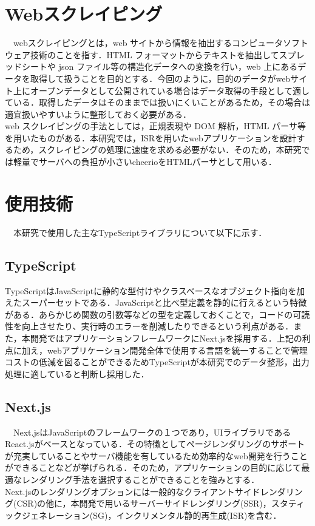 \section{Webスクレイピング}

　webスクレイピングとは，web サイトから情報を抽出するコンピュータソフトウェア技術のことを指す．HTML フォーマットからテキストを抽出してスプレッドシートや json ファイル等の構造化データへの変換を行い，web 上にあるデータを取得して扱うことを目的とする．今回のように，目的のデータがwebサイト上にオープンデータとして公開されている場合はデータ取得の手段として適している．取得したデータはそのままでは扱いにくいことがあるため，その場合は適宜扱いやすいように整形しておく必要がある．
 \\web スクレイピングの手法としては，正規表現や DOM 解析，HTML パーサ等を用いたものがある．本研究では，ISRを用いたwebアプリケーションを設計するため，スクレイピングの処理に速度を求める必要がない．そのため，本研究では軽量でサーバへの負担が小さいcheerioをHTMLパーサとして用いる．
 
\section{使用技術}
　本研究で使用した主なTypeScriptライブラリについて以下に示す．
 
 \subsection{TypeScript}
 TypeScriptはJavaScriptに静的な型付けやクラスベースなオブジェクト指向を加えたスーパーセットである．JavaScriptと比べ型定義を静的に行えるという特徴がある．あらかじめ関数の引数等などの型を定義しておくことで，コードの可読性を向上させたり、実行時のエラーを削減したりできるという利点がある．また，本開発ではアプリケーションフレームワークにNext.jsを採用する．上記の利点に加え，webアプリケーション開発全体で使用する言語を統一することで管理コストの低減を図ることができるためTypeScriptが本研究でのデータ整形，出力処理に適していると判断し採用した．

\subsection{Next.js}
　Next.jsはJavaScriptのフレームワークの１つであり，UIライブラリであるReact.jsがベースとなっている．その特徴としてページレンダリングのサポートが充実していることやサーバ機能を有しているため効率的なweb開発を行うことができることなどが挙げられる．そのため，アプリケーションの目的に応じて最適なレンダリング手法を選択することができることを強みとする．\\
 Next.jsのレンダリングオプションには一般的なクライアントサイドレンダリング(CSR)の他に，本開発で用いるサーバーサイドレンダリング(SSR)，スタティックジェネレーション(SG)，インクリメンタル静的再生成(ISR)を含む．

